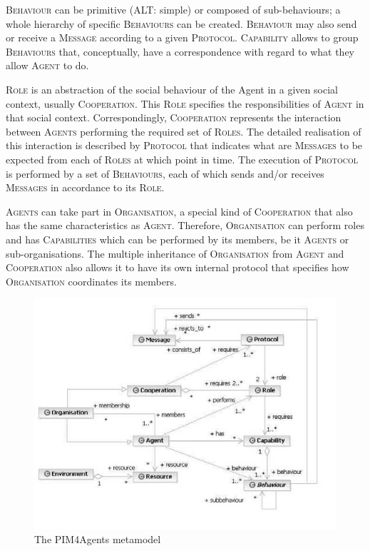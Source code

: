 \textsc{Behaviour} can be primitive (ALT: simple) or composed of sub-behaviours; a whole hierarchy of specific \textsc{Behaviours} can be created.
\textsc{Behaviour} may also send or receive a \textsc{Message} according to a given \textsc{Protocol}.
\textsc{Capability} allows to group \textsc{Behaviours} that, conceptually, have a correspondence with regard to what they allow \textsc{Agent} to do.

\textsc{Role} is an abstraction of the social behaviour of the Agent in a given social context, usually \textsc{Cooperation}.
This \textsc{Role} specifies the responsibilities of \textsc{Agent} in that social context.
Correspondingly, \textsc{Cooperation} represents the interaction between \textsc{Agents} performing the required set of \textsc{Roles}.
The detailed realisation of this interaction is described by \textsc{Protocol} that indicates what are \textsc{Messages} to be expected from each of \textsc{Roles} at which point in time.
The execution of \textsc{Protocol} is performed by a set of \textsc{Behaviours}, each of which sends and/or receives \textsc{Messages} in accordance to its \textsc{Role}.

\textsc{Agents} can take part in \textsc{Organisation}, a special kind of \textsc{Cooperation} that also has the same characteristics as \textsc{Agent}.
Therefore, \textsc{Organisation} can perform roles and has \textsc{Capabilities} which can be performed by its members, be it \textsc{Agents} or sub-organisations.
The multiple inheritance of \textsc{Organisation} from \textsc{Agent} and \textsc{Cooperation} also allows it to have its own internal protocol that specifies how \textsc{Organisation} coordinates its members.

\begin{figure}[ht]
	\centering
	\includegraphics[width=\textwidth]{images/pim4agents/pim4agents-metamodel.png}
	\caption{The PIM4Agents metamodel}
	\label{figure:pim4agents-metamodel}
\end{figure}

